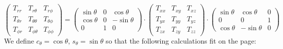 \documentclass[a4paper,12pt]{article}
\begin{document}
\[
\left(
\begin{array}{ccc}
T_{rr}       & T_{r\theta}      & T_{r\phi} \\
T_{\theta r} & T_{\theta\theta} & T_{\theta\phi} \\
T_{\phi r}   & T_{\phi \theta}  & T_{\phi\phi}
\end{array}
\right)
=
\left(
\begin{array}{ccc}
\sin\theta  & 0 & \cos\theta \\
\cos\theta  & 0 & -\sin\theta \\
0 & 1 & 0 
\end{array}
\right)
\cdot
\left(
\begin{array}{ccc}
T_{xx} & T_{xy} & T_{xz} \\
T_{yx} & T_{yy} & T_{yz} \\
T_{zx} & T_{zy} & T_{zz} 
\end{array}
\right)
\cdot
\left(
\begin{array}{ccc}
\sin\theta & \cos\theta & 0 \\
0 & 0 & 1 \\
\cos\theta & -\sin\theta & 0
\end{array}
\right)
\]
We define $c_\theta=\cos\theta$, $s_\theta=\sin\theta$ so that 
the following calculations fit on the page:
\end{document}
